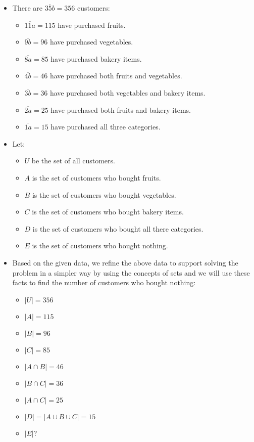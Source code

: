 \documentclass[12pt, a4paper, twoside]{report} %
\begin{document}
  \begin{itemize}
    \item There are $\overline{35b} = 356$ customers:
    \begin{itemize}
      \item $\overline{11a} = 115$ have purchased fruits.
      \item $\overline{9b} = 96$ have purchased vegetables.
      \item $\overline{8a} = 85$ have purchased bakery items.
      \item $\overline{4b} = 46$ have purchased both fruits and vegetables.
      \item $\overline{3b} = 36$ have purchased both vegetables and bakery items.
      \item $\overline{2a} = 25$ have purchased both fruits and bakery items.
      \item $\overline{1a} = 15$ have purchased all three categories.
    \end{itemize}
    \item Let:
    \begin{itemize}
      \item $U$ be the set of all customers.
      \item $A$ is the set of customers who bought fruits.
      \item $B$ is the set of customers who bought vegetables.
      \item $C$ is the set of customers who bought bakery items.
      \item $D$ is the set of customers who bought all there categories.
      \item $E$ is the set of customers who bought nothing.
    \end{itemize}
    \item Based on the given data, we refine the above data to support solving the problem in a simpler way by using the concepts of sets and we will use these facts to find the number of customers who bought nothing:
    \begin{itemize}
      \item $|U| = 356$
      \item $|A| = 115$
      \item $|B| = 96$
      \item $|C| = 85$
      \item $|A \cap B| = 46$
      \item $|B \cap C| = 36$
      \item $|A \cap C| = 25$
      \item $|D| = |A \cup B \cup C| = 15$
      \item $|E|$?
    \end{itemize}
  \end{itemize}
\end{document}
